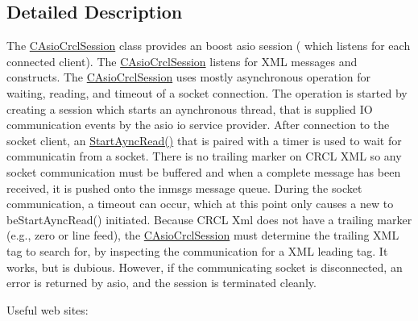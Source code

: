 \subsection{Detailed Description}
The \hyperlink{classCAsioCrclSession}{C\-Asio\-Crcl\-Session} class provides an boost asio session ( which listens for each connected client). The \hyperlink{classCAsioCrclSession}{C\-Asio\-Crcl\-Session} listens for X\-M\-L messages and constructs. The \hyperlink{classCAsioCrclSession}{C\-Asio\-Crcl\-Session} uses mostly asynchronous operation for waiting, reading, and timeout of a socket connection. The operation is started by creating a session which starts an aynchronous thread, that is supplied I\-O communication events by the asio io service provider. After connection to the socket client, an \hyperlink{classCAsioCrclSession_ac7e0900916ab6de40bf546116d5e6d3e}{Start\-Aync\-Read()} that is paired with a timer is used to wait for communicatin from a socket. There is no trailing marker on C\-R\-C\-L X\-M\-L so any socket communication must be buffered and when a complete message has been received, it is pushed onto the inmsgs message queue. During the socket communication, a timeout can occur, which at this point only causes a new to be\-Start\-Aync\-Read() initiated. Because C\-R\-C\-L Xml does not have a trailing marker (e.\-g., zero or line feed), the \hyperlink{classCAsioCrclSession}{C\-Asio\-Crcl\-Session} must determine the trailing X\-M\-L tag to search for, by inspecting the communication for a X\-M\-L leading tag. It works, but is dubious. However, if the communicating socket is disconnected, an error is returned by asio, and the session is terminated cleanly. \par
 Useful web sites\-: 

